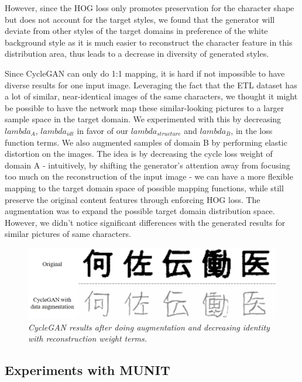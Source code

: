 \documentclass[12pt]{report}
\begin{document}
However, since the HOG loss only promotes preservation for the character shape but does not account for the target styles, we found that the generator will deviate from other styles of the target domains in preference of the white background style as it is much easier to reconstruct the character feature in this distribution area, thus leads to a decrease in diversity of generated styles.

Since CycleGAN can only do 1:1 mapping, it is hard if not impossible to have diverse results for one input image. Leveraging the fact that the ETL dataset has a lot of similar, near-identical images of the same characters, we thought it might be possible to have the network map these similar-looking pictures to a larger sample space in the target domain. We experimented with this by decreasing $lambda_A$, $lambda_{idt}$ in favor of our $lambda_{structure}$ and $lambda_B$, in the loss function terms. We also augmented samples of domain B by performing elastic distortion on the images. The idea is by decreasing the cycle loss weight of domain A - intuitively, by shifting the generator's attention away from focusing too much on the reconstruction of the input image - we can have a more flexible mapping to the target domain space of possible mapping functions, while still preserve the original content features through enforcing HOG loss. The augmentation was to expand the possible target domain distribution space. However, we didn't notice significant differences with the generated results for similar pictures of same characters.

\begin{figure}[h]
	\centering
	\includegraphics[scale=0.6]{augment-example}
	\caption{\textit{CycleGAN results after doing augmentation and decreasing identity with reconstruction weight terms.}}
	\label{fig:augment-example}
\end{figure}

\subsection{Experiments with MUNIT}
\end{document}
